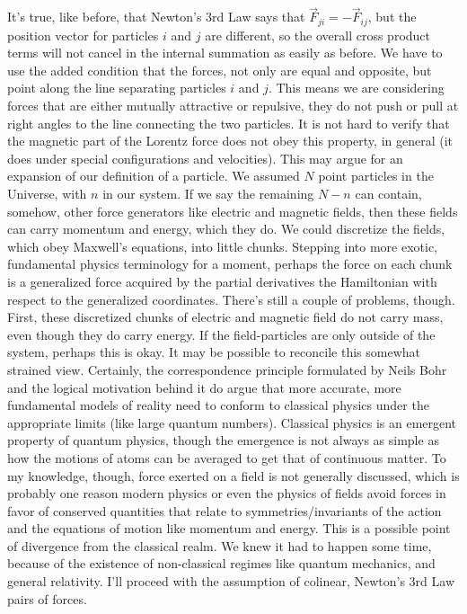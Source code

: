 \documentclass[10pt]{article}
\begin{document}
It's true, like before, that Newton's 3rd Law says that 
$\vec{F}_{ji} = - \vec{F}_{ij}$, but the position vector for 
particles $i$ and $j$ are different, so the overall cross product
terms will not cancel in the internal summation as easily as before. 
We have to use
the added condition that the forces, not only are equal and opposite, but 
point along the line separating particles $i$ and $j$. This means 
we are considering forces that are either mutually attractive or 
repulsive, they do not push or pull at right angles to the line connecting the 
two particles. It is not hard to verify that 
the magnetic part of the Lorentz force does not 
obey this property, in general (it does under special configurations and 
velocities). This may argue for an expansion of our definition of 
a particle. We assumed $N$ point particles in the Universe, with $n$ in 
our system. If we say the remaining $N-n$ can contain, somehow, other force 
generators like electric and magnetic fields, then these fields 
can carry momentum and energy, which they do. We could discretize the 
fields, which obey Maxwell's equations, into little chunks. Stepping 
into more exotic, fundamental physics terminology for a moment, perhaps 
the force on each chunk is a generalized force acquired by the 
partial derivatives the Hamiltonian with respect to the generalized 
coordinates. There's still a couple of problems, though. First, these 
discretized chunks of electric and magnetic field do not carry 
mass, even though they do carry energy. If the field-particles are 
only outside of the system, perhaps this is okay. 
It may be 
possible to reconcile this somewhat strained view. Certainly, the 
correspondence principle formulated by Neils Bohr and the 
logical motivation behind it do argue that 
more accurate, more fundamental models of reality need to conform to 
classical physics under the appropriate limits (like large 
quantum numbers). Classical physics is an emergent property of quantum 
physics, though the emergence is not always as simple as how 
the motions of atoms can be averaged to get that of continuous matter.
To my knowledge, though, force 
exerted on a field is not generally discussed, 
which is probably 
one reason modern physics or even the physics of fields avoid forces 
in favor of conserved quantities that relate to symmetries/invariants of 
the action and the equations of motion like momentum and energy. This is 
a possible point of divergence from the classical realm. We knew it had to 
happen some time, because of the existence of non-classical regimes like 
quantum mechanics, and general relativity. I'll proceed with the 
assumption of colinear, Newton's 3rd Law pairs of forces.
\end{document}
